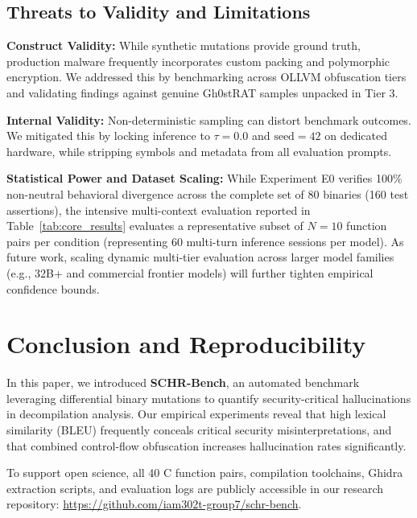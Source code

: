 \documentclass[conference]{IEEEtran}
\begin{document}
\subsection{Threats to Validity and Limitations}
\textbf{Construct Validity:} While synthetic mutations provide ground truth, production malware frequently incorporates custom packing and polymorphic encryption. We addressed this by benchmarking across OLLVM obfuscation tiers and validating findings against genuine Gh0stRAT samples unpacked in Tier 3.

\textbf{Internal Validity:} Non-deterministic sampling can distort benchmark outcomes. We mitigated this by locking inference to $\tau = 0.0$ and $\text{seed} = 42$ on dedicated hardware, while stripping symbols and metadata from all evaluation prompts.

\textbf{Statistical Power and Dataset Scaling:} While Experiment E0 verifies 100\% non-neutral behavioral divergence across the complete set of 80 binaries (160 test assertions), the intensive multi-context evaluation reported in Table~\ref{tab:core_results} evaluates a representative subset of $N=10$ function pairs per condition (representing 60 multi-turn inference sessions per model). As future work, scaling dynamic multi-tier evaluation across larger model families (e.g., 32B+ and commercial frontier models) will further tighten empirical confidence bounds.

\section{Conclusion and Reproducibility}
In this paper, we introduced \textbf{SCHR-Bench}, an automated benchmark leveraging differential binary mutations to quantify security-critical hallucinations in decompilation analysis. Our empirical experiments reveal that high lexical similarity (BLEU) frequently conceals critical security misinterpretations, and that combined control-flow obfuscation increases hallucination rates significantly.

To support open science, all 40 C function pairs, compilation toolchains, Ghidra extraction scripts, and evaluation logs are publicly accessible in our research repository: \url{https://github.com/iam302t-group7/schr-bench}.

\balance


\end{document}
